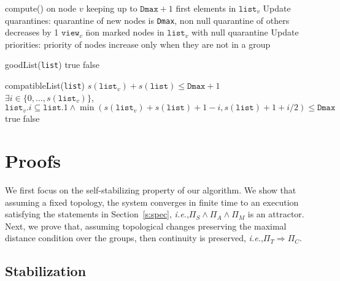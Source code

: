 \documentclass[11pt,english]{article}
\newcommand{\Latin}[1]{\textit{#1}}
\newcommand{\ie}{\Latin{i.e.},\xspace}
\begin{document}
\begin{footnotesize}
\begin{algorithm*}{compute() on node $v$}
    \ENDFOR \label{l:compute2e}
	  \I keeping up to $\texttt{Dmax}+1$ first elements in $\texttt{list}_v$
    \label{l:truncate}
  \ENDIF
  \I Update quarantines: quarantine of new nodes is \texttt{Dmax}, non null quarantine of
  others decreases by 1
	\I $\texttt{view}_v$ \= non marked nodes in $\texttt{list}_v$ with null quarantine \label{l:view}
	\I Update priorities: priority of nodes increase only when they are not in a group
\end{algorithm*}
\renewcommand{\AlgTextName}{{\AlgStyName Function}}
\begin{algorithm*}{goodList(\texttt{list})}
  \RETURN true
\ELSE
\RETURN false
\end{algorithm*}
\begin{algorithm*}{compatibleList(\texttt{list})}
\I\AlgTextIF $s(\texttt{list}_v) + s(\texttt{list}) \leq \texttt{Dmax}+1$ \OR \\
	\noindent\mbox{}\hspace{\AlgInd}
  $\exists i \in \{0,\ldots,s(\texttt{list}_v)\}$,
  $\texttt{list}_v.i \subseteq \texttt{list}.1 \wedge \min\left(s(\texttt{list}_v) + s(\texttt{list}) +1-i,
  s(\texttt{list}) + 1 + i/2\right)  \leq \texttt{Dmax}$
	    \RETURN true 
\ELSE
\RETURN false
\end{algorithm*}


\end{footnotesize}



\section{Proofs}\label{s:proof}


We first focus on the self-stabilizing property of our algorithm. We show that
assuming a fixed topology, the system converges in finite time to an execution
satisfying the statements in Section~\ref{s:spec}, \ie $\Pi_S \wedge \Pi_A
\wedge \Pi_M$ is an attractor.  Next, we prove that, assuming topological
changes preserving the maximal distance condition over the groups, then
continuity is preserved, \ie $\Pi_T \Rightarrow \Pi_C$.

\subsection{Stabilization}
\end{document}
